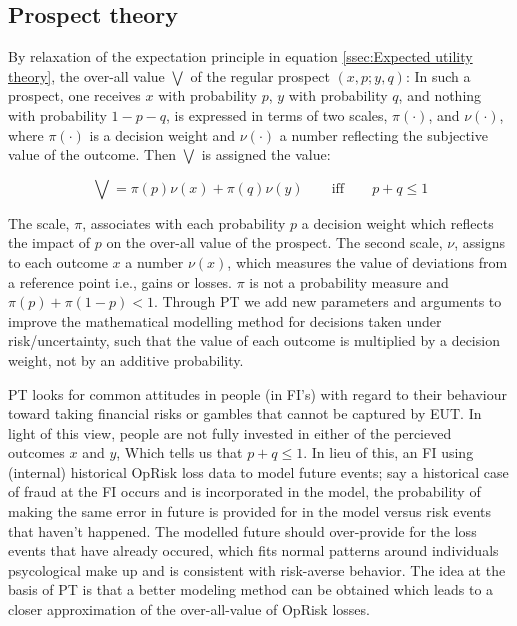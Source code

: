 \documentclass{DissertateUSU}
\begin{document}
\subsection{Prospect theory}
\label{ssec:Prospect theory}

By relaxation of the expectation principle in equation
\ref{ssec:Expected utility theory}, the over-all value
\(\mathbf{\bigvee}\) of the regular prospect \((x,p;y,q)\): In such a
prospect, one receives \(x\) with probability \(p\), \(y\) with
probability \(q\), and nothing with probability \(1-p-q\), is expressed
in terms of two scales, \(\pi(\cdot)\), and \(\nu(\cdot)\), where
\(\pi(\cdot)\) is a decision weight and \(\nu(\cdot)\) a number
reflecting the subjective value of the outcome. Then
\(\mathbf{\bigvee}\) is assigned the value:

\begin{equation}\label{eqn2}
\mathbf{\bigvee}=\pi(p)\nu(x)+\pi(q)\nu(y) \qquad\mbox{iff} \qquad p+q \leq 1
\end{equation}

The scale, \(\pi\), associates with each probability \(p\) a decision
weight which reflects the impact of \(p\) on the over-all value of the
prospect. The second scale, \(\nu\), assigns to each outcome \(x\) a
number \(\nu(x)\), which measures the value of deviations from a
reference point i.e., gains or losses. \(\pi\) is not a probability
measure and \(\pi(p) + \pi(1-p) < 1\). Through PT we add new parameters
and arguments to improve the mathematical modelling method for decisions
taken under risk/uncertainty, such that the value of each outcome is
multiplied by a decision weight, not by an additive probability.

PT looks for common attitudes in people (in FI's) with regard to their
behaviour toward taking financial risks or gambles that cannot be
captured by EUT. In light of this view, people are not fully invested in
either of the percieved outcomes \(x\) and \(y\), Which tells us that
\(p+q \leq 1\). In lieu of this, an FI using (internal) historical
OpRisk loss data to model future events; say a historical case of fraud
at the FI occurs and is incorporated in the model, the probability of
making the same error in future is provided for in the model versus risk
events that haven't happened. The modelled future should over-provide
for the loss events that have already occured, which fits normal
patterns around individuals psycological make up and is consistent with
risk-averse behavior. The idea at the basis of PT is that a better
modeling method can be obtained which leads to a closer approximation of
the over-all-value of OpRisk losses.
\end{document}

